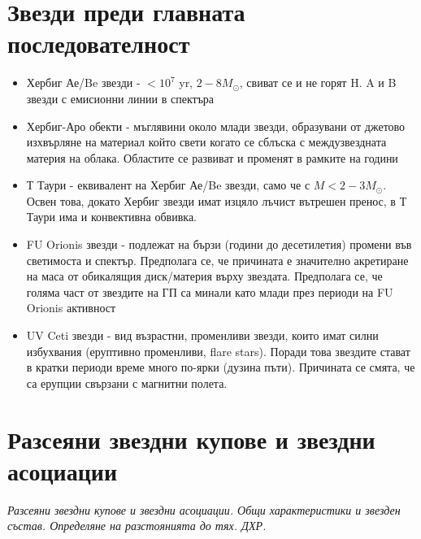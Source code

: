 \documentclass[a4paper,12pt]{article}
\begin{document}
\section{Звезди преди главната последователност}
\begin{itemize}
\item Хербиг Ае/Be звезди - $<10^7$ yr, $2-8 M_\odot$, свиват се и не горят H. A и B звезди с емисионни линии в спектъра
\item Хербиг-Аро обекти - мъглявини около млади звезди, образувани от джетово изхвърляне на материал който свети когато се сблъска с междузвездната материя на облака. Областите се развиват и променят в рамките на години
\item Т Таури  - еквивалент на Хербиг Ае/Be звезди, само че с $M < 2-3 M_\odot$. Освен това, докато Хербиг звезди имат изцяло лъчист вътрешен пренос, в Т Таури има и конвективна обвивка.
\item FU Orionis звезди - подлежат на бързи (години до десетилетия) промени във светимоста и спектър. Предполага се, че причината е значително акретиране на маса от обикалящия диск/материя върху звездата. Предполага се, че голяма част от звездите на ГП са минали като млади през периоди на FU Orionis активност
\item UV Ceti звезди - вид възрастни, променливи звезди, които имат силни избухвания (еруптивно променливи, flare stars). Поради това звездите стават в кратки периоди време много по-ярки (дузина пъти). Причината се смята, че са ерупции свързани с магнитни полета.
\end{itemize}



\section{Разсеяни звездни купове и звездни асоциации}
\textit{Разсеяни звездни купове и звездни асоциации. Общи характеристики и звезден състав.
Определяне на разстоянията до тях. ДХР.}
\end{document}
